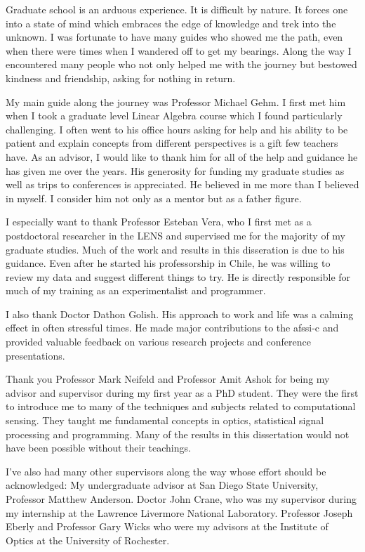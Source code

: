 Graduate school is an arduous experience. It is difficult by nature. It forces one into a state of mind which embraces the edge of knowledge and trek into the unknown. I was fortunate to have many guides who showed me the path, even when there were times when I wandered off to get my bearings. Along the way I encountered many people who not only helped me with the journey but bestowed kindness and friendship, asking for nothing in return.

My main guide along the journey was Professor Michael Gehm. I first met him when I took a graduate level Linear Algebra course which I found particularly challenging. I often went to his office hours asking for help and his ability to be patient and explain concepts from different perspectives is a gift few teachers have. As an advisor, I would like to thank him for all of the help and guidance he has given me over the years. His generosity for funding my graduate studies as well as trips to conferences is appreciated. He believed in me more than I believed in myself. I consider him not only as a mentor but as a father figure.

I especially want to thank Professor Esteban Vera, who I first met as a postdoctoral researcher in the \gls{LENS} and supervised me for the majority of my graduate studies. Much of the work and results in this disseration is due to his guidance. Even after he started his professorship in Chile, he was willing to review my data and suggest different things to try. He is directly responsible for much of my training as an experimentalist and programmer. 

I also thank Doctor Dathon Golish. His approach to work and life was a calming effect in often stressful times. He made major contributions to the \gls{afssi-c} and provided valuable feedback on various research projects and conference presentations.

Thank you Professor Mark Neifeld and Professor Amit Ashok for being my advisor and supervisor during my first year as a PhD student. They were the first to introduce me to many of the techniques and subjects related to computational sensing. They taught me fundamental concepts in optics, statistical signal processing and programming. Many of the results in this dissertation would not have been possible without their teachings.

I've also had many other supervisors along the way whose effort should be acknowledged: My undergraduate advisor at San Diego State University, Professor Matthew Anderson. Doctor John Crane, who was my supervisor during my internship at the Lawrence Livermore National Laboratory. Professor Joseph Eberly and Professor Gary Wicks who were my advisors at the Institute of Optics at the University of Rochester. 

